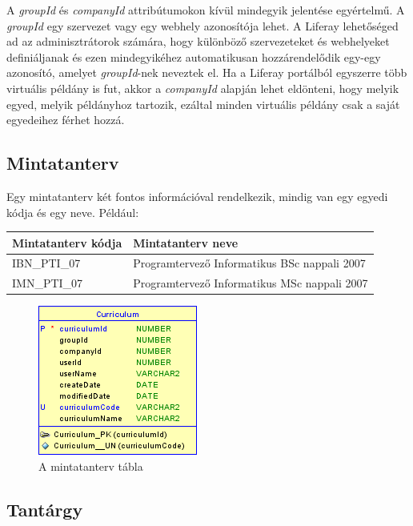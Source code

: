 \documentclass[hidelinks, 12pt, a4paper]{report}
\begin{document}
A \emph{groupId} és \emph{companyId} attribútumokon kívül mindegyik jelentése egyértelmű. A \emph{groupId} egy szervezet vagy egy webhely azonosítója lehet. A Liferay lehetőséged ad az adminisztrátorok számára, hogy különböző szervezeteket és webhelyeket definiáljanak és ezen mindegyikéhez automatikusan hozzárendelődik egy-egy azonosító, amelyet \emph{groupId}-nek neveztek el. Ha a Liferay portálból egyszerre több virtuális példány is fut, akkor a \emph{companyId} alapján lehet eldönteni, hogy melyik egyed, melyik példányhoz tartozik, ezáltal minden virtuális példány csak a saját egyedeihez férhet hozzá.

\subsection{Mintatanterv}

Egy mintatanterv két fontos információval rendelkezik, mindig van egy egyedi kódja és egy neve. Például:

\begin{table}[H]
	\centering
	\begin{tabular}{| l | l |}
	\hline
	\textbf{Mintatanterv kódja} & \textbf{Mintatanterv neve} \\
	\hline
	IBN\_PTI\_07 & Programtervező Informatikus BSc nappali 2007 \\
	\hline
	IMN\_PTI\_07 & Programtervező Informatikus MSc nappali 2007 \\
	\hline
\end{tabular}
\end{table}

\begin{figure}[H]
    \centering
	\includegraphics{curriculum.png}
	\caption{A mintatanterv tábla}
\end{figure}

\subsection{Tantárgy}
\end{document}
